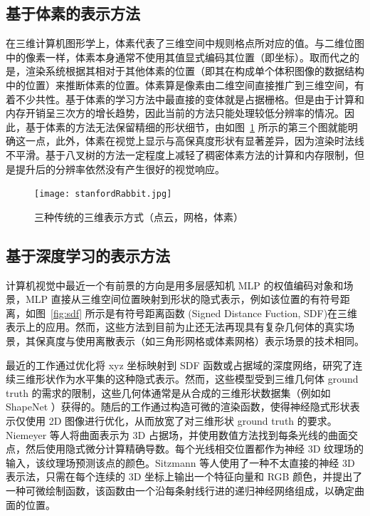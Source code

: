 \subsection{基于体素的表示方法}
在三维计算机图形学上，体素代表了三维空间中规则格点所对应的值。与二维位图中的像素一样，体素本身通常不使用其值显式编码其位置（即坐标）。取而代之的是，渲染系统根据其相对于其他体素的位置（即其在构成单个体积图像的数据结构中的位置）来推断体素的位置。体素算是像素由二维空间直接推广到三维空间，有着不少共性。基于体素的学习方法中最直接的变体就是占据栅格。但是由于计算和内存开销呈三次方的增长趋势，因此当前的方法只能处理较低分辨率的情况。因此，基于体素的方法\cite{20153D,Choy20163D}无法保留精细的形状细节，由如图~\ref{fig:stanfordRabbit} 所示的第三个图就能明确这一点，此外，体素在视觉上显示与高保真度形状有显著差异，因为渲染时法线不平滑。基于八叉树\cite{Tatarchenko2017Octree,riegler2017octnet,hane2017hierarchical}的方法一定程度上减轻了稠密体素方法的计算和内存限制，但是提升后的分辨率依然没有产生很好的视觉响应。

\begin{figure}[t]
  \centering
  \texttt{[image: stanfordRabbit.jpg]}
  \caption{三种传统的三维表示方式（点云，网格，体素）}
  \label{fig:stanfordRabbit}
\end{figure}

\subsection{基于深度学习的表示方法}
计算机视觉中最近一个有前景的方向是用多层感知机 MLP 的权值编码对象和场景，MLP 直接从三维空间位置映射到形状的隐式表示，例如该位置的有符号距离\cite{curless1996volumetric}，如图~\ref{fig:sdf} 所示是有符号距离函数 (Signed Distance Fuction, SDF)在三维表示上的应用。然而，这些方法到目前为止还无法再现具有复杂几何体的真实场景，其保真度与使用离散表示（如三角形网格或体素网格）表示场景的技术相同。

最近的工作通过优化将 xyz 坐标映射到 SDF 函数\cite{jiang2020local,park2019deepsdf,chabra2020deep}或占据域\cite{genova2020local,mescheder2019occupancy}的深度网络，研究了连续三维形状作为水平集的这种隐式表示。然而，这些模型受到三维几何体 ground truth 的需求的限制，这些几何体通常是从合成的三维形状数据集（例如如 ShapeNet\cite{chang2015shapenet} ）获得的。随后的工作通过构造可微的渲染函数，使得神经隐式形状表示仅使用 2D 图像进行优化，从而放宽了对三维形状 ground truth 的要求。Niemeyer 等人\cite{niemeyer2020differentiable}将曲面表示为 3D 占据场，并使用数值方法找到每条光线的曲面交点，然后使用隐式微分计算精确导数。每个光线相交位置都作为神经 3D 纹理场的输入，该纹理场预测该点的颜色。Sitzmann 等人\cite{sitzmann2019scene}使用了一种不太直接的神经 3D 表示法，只需在每个连续的 3D 坐标上输出一个特征向量和 RGB 颜色，并提出了一种可微绘制函数，该函数由一个沿每条射线行进的递归神经网络组成，以确定曲面的位置。

